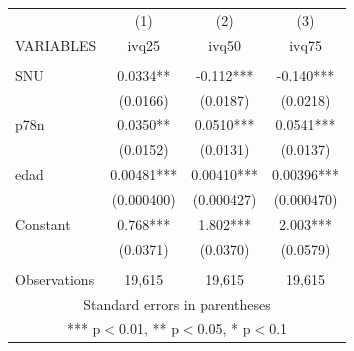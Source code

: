 \begin{tabular}{lccc} \hline
 & (1) & (2) & (3) \\
VARIABLES & ivq25 & ivq50 & ivq75 \\ \hline
 &  &  &  \\
SNU & 0.0334** & -0.112*** & -0.140*** \\
 & (0.0166) & (0.0187) & (0.0218) \\
p78n & 0.0350** & 0.0510*** & 0.0541*** \\
 & (0.0152) & (0.0131) & (0.0137) \\
edad & 0.00481*** & 0.00410*** & 0.00396*** \\
 & (0.000400) & (0.000427) & (0.000470) \\
Constant & 0.768*** & 1.802*** & 2.003*** \\
 & (0.0371) & (0.0370) & (0.0579) \\
 &  &  &  \\
 Observations & 19,615 & 19,615 & 19,615 \\ \hline
\multicolumn{4}{c}{ Standard errors in parentheses} \\
\multicolumn{4}{c}{ *** p$<$0.01, ** p$<$0.05, * p$<$0.1} \\
\end{tabular}
